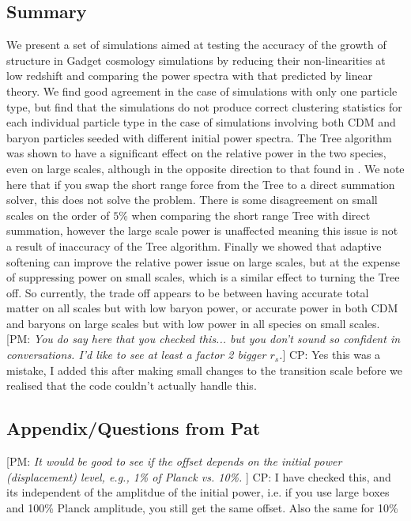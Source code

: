 \documentclass[]{article}
\def\pvm#1{[PM: {\it #1}] }
\newcommand{\CP}[1]{{\color{red}CP: #1}}
\begin{document}
\subsection{Summary}
We present a set of simulations aimed at testing the accuracy of the growth of structure in Gadget cosmology simulations by reducing their non-linearities at low redshift and comparing the power spectra with that predicted by linear theory. We find good agreement in the case of simulations with only one particle type, but find that the simulations do not produce correct clustering statistics for each individual particle type in the case of simulations involving both CDM and baryon particles seeded with different initial power spectra. The Tree algorithm was shown to have a significant effect on the relative power in the two species, even on large scales, although in the opposite direction to that found in \cite{Angulo2013}. We note here that if you swap the short range force from the Tree to a direct summation solver, this does not solve the problem. There is some disagreement on small scales on the order of $5\%$ when comparing the short range Tree with direct summation, however the large scale power is unaffected meaning this issue is not a result of inaccuracy of the Tree algorithm. Finally we showed that adaptive softening can improve the relative power issue on large scales, but at the expense of suppressing power on small scales, which is a similar effect to turning the Tree off. So currently, the trade off appears to be between having accurate total matter on all scales but with low baryon power, or accurate power in both CDM and baryons on large scales but with low power in all species on small scales.
\pvm{You do say here that you checked this... but you don't sound so 
confident in conversations. I'd like to see at least a factor 2 bigger
$r_s$.}
\CP{Yes this was a mistake, I added this after making small changes to the transition
scale before we realised that the code couldn't actually handle this.}

\subsection{Appendix/Questions from Pat}

\pvm{It would be good to see if the offset depends on the initial power 
(displacement) level, e.g., 1\% of Planck vs. 10\%.
}
\CP{I have checked this, and its independent of the amplitdue of the initial power,
i.e. if you use large boxes and 100\% Planck amplitude, you still get the same offset.
Also the same for 10\%}
\end{document}
